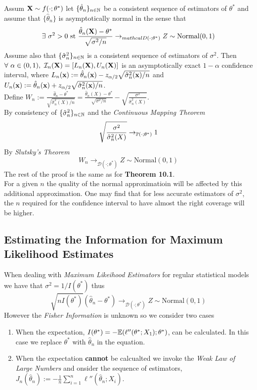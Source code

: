 \documentclass[11pt,a4paper]{article}
\begin{document}
\theorem{}
Assum $\textbf{X}\sim f(\cdot;\theta^*)$ let $\{\hat{\theta}_n\}_{n\in\mathbb{N}}$ be a consistent sequence of estimators of $\theta^*$ and assume that $\{\hat{\theta}_n\}$ is asymptotically normal in the sense that
$$\exists\ \sigma^2>0\text{ st }\frac{\hat{\theta}_n(\textbf{X})-\theta^*}{\sqrt{\sigma^2/n}}\to_{mathcal{D}(\cdot;\theta^*)}Z\sim\text{Normal}(0,1)$$
Assume also that $\{\hat{\sigma}^2_n\}_{n\in\mathbb{N}}$ is a consistent sequence of estimators of $\sigma^2$. Then $\forall\ \alpha\in(0,1),\ \mathcal{I}_n(\X)=[L_n(\X),U_n(\X)]$ is an asymptotically exact $1-\alpha$ confidence interval, where $L_n(\textbf{x}):=\hat{\theta}_n(\textbf{x})-z_{\alpha/2}\sqrt{\hat{\sigma}_n^2(\textbf{x})/n}$ and $U_n(\textbf{x}):=\hat{\theta}_n(\textbf{x})+z_{\alpha/2}\sqrt{\hat{\sigma}_n^2(\textbf{x})/n}$.\\

Define $W_n:=\frac{\hat{\theta}_n-\theta^*}{\sqrt{\hat{\sigma}^2_n(X)/n}}=\frac{\hat{\theta}_n(X)-\theta^*}{\sqrt{\sigma^2/n}}-\sqrt{\frac{\sigma^2}{\hat{\sigma}^2_n(X)}}$.\\
By consistency of $\{\hat{\sigma}^2_n\}_{n\in\mathbb{N}}$ and the \textit{Continuous Mapping Theorem}
$$\sqrt{\frac{\sigma^2}{\hat{\sigma}^2_n(X)}}\to_{\mathbb{P}(\cdot;\theta^*)}1$$
By \textit{Slutsky's Theorem}
$$W_n\to_{\mathcal{D}(\cdot;\theta^*)}Z\sim\text{Normal}(0,1)$$
The rest of the proof is the same as for \textbf{Theorem 10.1}.\\

For a given $n$ the quality of the normal approximatioin will be affected by this additional approximation. One may find that for less accurate estimators of $\sigma^2$, the $n$ required for the confidence interval to have almost the right coverage will be higher.

\subsection{Estimating the Information for Maximum Likelihood Estimates}

When dealing with \textit{Maximum Likeihood Estimators} for regular statistical models we have that $\sigma^2=1/I(\theta^*)$ thus
$$\sqrt{nI(\theta^*)}(\hat{\theta}_n-\theta^*)\to_{\mathcal{D}(\cdot;\theta^*)}Z\sim\text{Normal}(0,1)$$
However the \textit{Fisher Information} is unknown so we consider two cases
\begin{enumerate}[label=\roman*)]
	\item When the expectation, $I(\theta^*)=-\mathbb{E}(\ell''(\theta^*;X_1);\theta^*)$, can be calculated. In this case we replace $\theta^*$ with $\hat{\theta}_n$ in the equation.
	\item When the expectation \textbf{cannot} be calcualted we invoke the \textit{Weak Law of Large Numbers} and onsider the sequence of estimators, $J_n(\hat{\theta}_n):=-\frac{1}{n}\sum_{i=1}^n\ell''(\hat{\theta}_n;X_i)$.
\end{enumerate}
\end{document}
